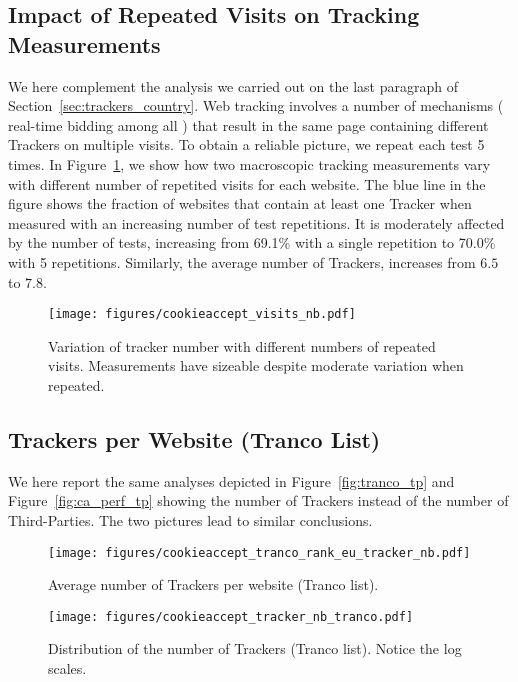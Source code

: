 
\subsection*{Impact of Repeated Visits on Tracking Measurements}

We here complement the analysis we carried out on the last paragraph of Section~\ref{sec:trackers_country}. Web tracking involves a number of mechanisms ( real-time bidding among all ) that result in the same page containing different Trackers on multiple visits. To obtain a reliable picture, we repeat each test 5 times. In Figure~\ref{fig:visit_nb}, we show how two macroscopic tracking measurements vary with different number of repetited visits for each website. The blue line in the figure shows the fraction of websites that contain at least one Tracker when measured with an increasing number of test repetitions. It is moderately affected by the number of tests, increasing from 69.1\% with a single repetition to 70.0\% with 5 repetitions. Similarly, the average number of Trackers, increases from $6.5$ to $7.8$.

\begin{figure}[!h]
    \centering
    \texttt{[image: figures/cookieaccept\_visits\_nb.pdf]}
    \caption{Variation of tracker number with different numbers of repeated visits. Measurements have sizeable despite moderate variation when repeated.}
	\label{fig:visit_nb}
\end{figure}

\newpage

\subsection*{Trackers per Website (Tranco List)}

We here report the same analyses depicted in Figure~\ref{fig:tranco_tp} and Figure~\ref{fig:ca_perf_tp} showing the number of Trackers instead of the number of Third-Parties. The two pictures lead to similar conclusions.

\begin{figure}[!h]
    \centering
    \texttt{[image: figures/cookieaccept\_tranco\_rank\_eu\_tracker\_nb.pdf]}
    \caption{Average number of Trackers per website (Tranco list).}
    \label{fig:tranco_trackers}
\end{figure}


\begin{figure}[!h]
    \centering
    \texttt{[image: figures/cookieaccept\_tracker\_nb\_tranco.pdf]}
    \caption{Distribution of the number of Trackers (Tranco list). Notice the log scales.}
    \label{fig:ca_perf_tracker}
\end{figure}